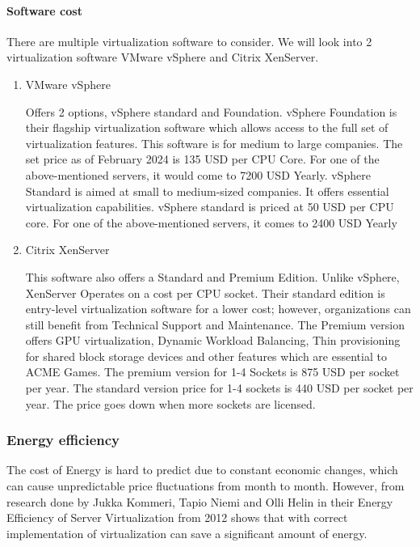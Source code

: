 \documentclass[10pt,oneside,english,a4paper]{article}
\begin{document}
\newpage
\paragraph{Software cost}\label{sfcost}


There are multiple virtualization software to consider. We will look into 2 virtualization software VMware vSphere and Citrix XenServer.
\begin{enumerate}
	\item VMware vSphere

Offers 2 options, vSphere standard and Foundation. vSphere Foundation is their flagship virtualization software which allows access to the full set of virtualization features. This software is for medium to large companies. The set price as of February 2024 is 135 USD per CPU Core. For one of the above-mentioned servers, it would come to 7200 USD Yearly. vSphere Standard is aimed at small to medium-sized companies. It offers essential virtualization capabilities. vSphere standard is priced at 50 USD per CPU core. For one of the above-mentioned servers, it comes to 2400 USD Yearly\cite{15.zdroj}\cite{21.zdroj}


	\item Citrix XenServer
	
This software also offers a Standard and Premium Edition. Unlike vSphere, XenServer Operates on a cost per CPU socket. Their standard edition is entry-level virtualization software for a lower cost; however, organizations can still benefit from Technical Support and Maintenance. The Premium version offers GPU virtualization, Dynamic Workload Balancing, Thin provisioning for shared block storage devices and other features which are essential to ACME Games. The premium version for 1-4 Sockets is 875 USD per socket per year. The standard version price for 1-4 sockets is 440 USD per socket per year. The price goes down when more sockets are  licensed.\cite{16.zdroj}\cite{21.zdroj}


\end{enumerate}


\subsubsection{Energy efficiency}
The cost of Energy is hard to predict due to constant economic changes, which can cause unpredictable price fluctuations from month to month. However, from research done by Jukka Kommeri, Tapio Niemi and Olli Helin in their Energy Efficiency of Server Virtualization from 2012 \cite{1.zdroj} shows that with correct implementation of virtualization can save a significant amount of energy.
\end{document}
